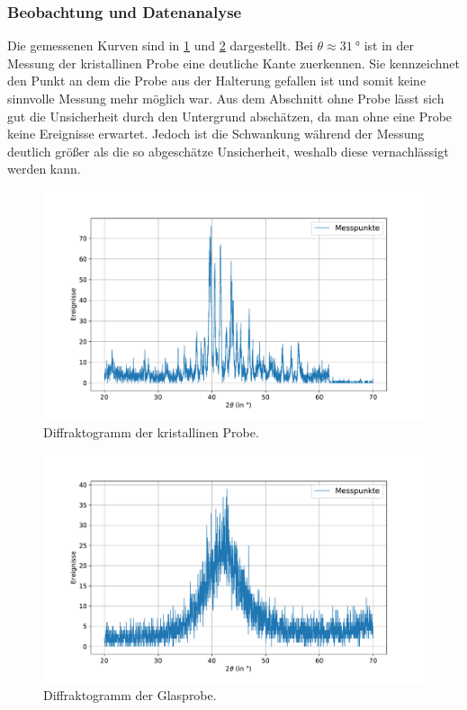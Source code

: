 \documentclass[
	a4paper,
	12pt,
	pagesize,
	ngerman
]{scrartcl}
\begin{document}
	\subsubsection{Beobachtung und Datenanalyse}
	Die gemessenen Kurven sind in \cref{fig_xrd_kristallin} und \cref{fig_xrd_glas} dargestellt.
	Bei $\theta \approx \SI{31}{\degree}$ ist in der Messung der kristallinen Probe eine deutliche Kante zuerkennen.
	Sie kennzeichnet den Punkt an dem die Probe aus der Halterung gefallen ist und somit keine sinnvolle Messung mehr möglich war.
	Aus dem Abschnitt ohne Probe lässt sich gut die Unsicherheit durch den Untergrund abschätzen, da man ohne eine Probe keine Ereignisse erwartet. %
	Jedoch ist die Schwankung während der Messung deutlich größer als die so abgeschätze Unsicherheit, weshalb diese vernachlässigt werden kann.
	\begin{figure}[H]
			\includegraphics[width=\linewidth]{img/XRD_Kristallin_45_25.pdf}
			\caption{Diffraktogramm der kristallinen Probe.}
			\label{fig_xrd_kristallin}
	\end{figure}
	\begin{figure}[H]
			\includegraphics[width=\linewidth]{img/XRD_Glas_45_25.pdf}
			\caption{Diffraktogramm der Glasprobe.}
			\label{fig_xrd_glas}
	\end{figure}
\end{document}
